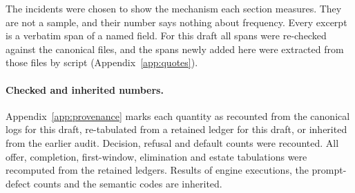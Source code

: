 The incidents were chosen to show the mechanism each section measures. They are not a sample, and their number says nothing about frequency. Every excerpt is a verbatim span of a named field. For this draft all spans were re-checked against the canonical files, and the spans newly added here were extracted from those files by script (Appendix~\ref{app:quotes}).

\paragraph{Checked and inherited numbers.} Appendix~\ref{app:provenance} marks each quantity as recounted from the canonical logs for this draft, re-tabulated from a retained ledger for this draft, or inherited from the earlier audit. Decision, refusal and default counts were recounted. All offer, completion, first-window, elimination and estate tabulations were recomputed from the retained ledgers. Results of engine executions, the prompt-defect counts and the semantic codes are inherited.

